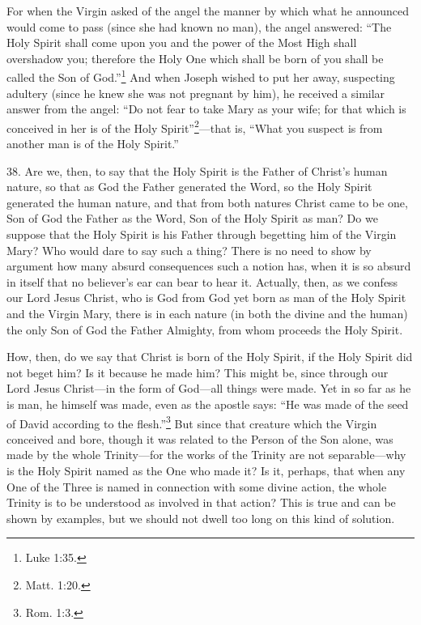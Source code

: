 For when the Virgin asked of the angel the manner by which what he announced would come to pass (since she had known no man), the angel answered: ``The Holy Spirit shall come upon you and the power of the Most High shall overshadow you; therefore the Holy One which shall be born of you shall be called the Son of God.''\footnote{Luke 1:35.} And when Joseph wished to put her away, suspecting adultery (since he knew she was not pregnant by him), he received a similar answer from the angel: ``Do not fear to take Mary as your wife; for that which is conceived in her is of the Holy Spirit''\footnote{Matt. 1:20.}—that is, ``What you suspect is from another man is of the Holy Spirit.''


38. Are we, then, to say that the Holy Spirit is the Father of Christ's human nature, so that as God the Father generated the Word, so the Holy Spirit generated the human nature, and that from both natures Christ came to be one, Son of God the Father as the Word, Son of the Holy Spirit as man? Do we suppose that the Holy Spirit is his Father through begetting him of the Virgin Mary? Who would dare to say such a thing? There is no need to show by argument how many absurd consequences such a notion has, when it is so absurd in itself that no believer's ear can bear to hear it. Actually, then, as we confess our Lord Jesus Christ, who is God from God yet born as man of the Holy Spirit and the Virgin Mary, there is in each nature (in both the divine and the human) the only Son of God the Father Almighty, from whom proceeds the Holy Spirit.

How, then, do we say that Christ is born of the Holy Spirit, if the Holy Spirit did not beget him? Is it because he made him? This might be, since through our Lord Jesus Christ—in the form of God—all things were made. Yet in so far as he is man, he himself was made, even as the apostle says: ``He was made of the seed of David according to the flesh.''\footnote{Rom. 1:3.} But since that creature which the Virgin conceived and bore, though it was related to the Person of the Son alone, was made by the whole Trinity—for the works of the Trinity are not separable—why is the Holy Spirit named as the One who made it? Is it, perhaps, that when any One of the Three is named in connection with some divine action, the whole Trinity is to be understood as involved in that action? This is true and can be shown by examples, but we should not dwell too long on this kind of solution.


